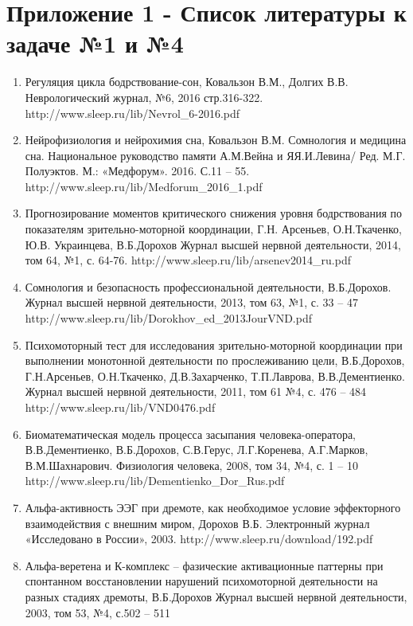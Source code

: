 \section*{Приложение 1 - Список литературы к задаче №1 и №4}

\begin{enumerate}
    \item Регуляция цикла бодрствование-сон, Ковальзон В.М., Долгих В.В. Неврологический журнал, №6, 2016 стр.316-322. http://www.sleep.ru/lib/Nevrol_6-2016.pdf 
    \item Нейрофизиология и нейрохимия сна, Ковальзон В.М. Сомнология и медицина сна. Национальное руководство памяти А.М.Вейна и ЯЯ.И.Левина/ Ред. М.Г. Полуэктов. М.: «Медфорум». 2016. С.11 – 55. 
    http://www.sleep.ru/lib/Medforum_2016_1.pdf
    \item Прогнозирование моментов критического снижения уровня бодрствования по показателям зрительно-моторной координации, Г.Н. Арсеньев, О.Н.Ткаченко, Ю.В. Украинцева, В.Б.Дорохов 
    Журнал высшей нервной деятельности, 2014, том 64, №1, с. 64-76. http://www.sleep.ru/lib/arsenev2014_ru.pdf
    \item Сомнология и безопасность профессиональной деятельности, В.Б.Дорохов. Журнал высшей  нервной деятельности, 2013, том 63, №1, с. 33 – 47
    http://www.sleep.ru/lib/Dorokhov_ed_2013JourVND.pdf  
    \item Психомоторный тест для исследования зрительно-моторной координации при выполнении монотонной деятельности по прослеживанию цели, В.Б.Дорохов, Г.Н.Арсеньев, О.Н.Ткаченко, Д.В.Захарченко, Т.П.Лаврова, В.В.Дементиенко. Журнал высшей нервной деятельности, 2011, том 61 №4, с. 476 – 484
    http://www.sleep.ru/lib/VND0476.pdf 
    \item Биоматематическая модель процесса засыпания человека-оператора, В.В.Дементиенко, В.Б.Дорохов, С.В.Герус, Л.Г.Коренева, А.Г.Марков, В.М.Шахнарович. Физиология человека, 2008, том 34, №4, с. 1 – 10
    http://www.sleep.ru/lib/Dementienko_Dor_Rus.pdf 
    \item Альфа-активность ЭЭГ при дремоте, как необходимое условие эффекторного взаимодействия с внешним миром, Дорохов В.Б. Электронный журнал «Исследовано в России», 2003.
    http://www.sleep.ru/download/192.pdf 
    \item Альфа-веретена и К-комплекс – фазические активационные паттерны при спонтанном восстановлении нарушений психомоторной деятельности на разных стадиях дремоты, В.Б.Дорохов
    Журнал высшей нервной деятельности, 2003, том 53, №4, с.502 – 511

\end{enumerate}

